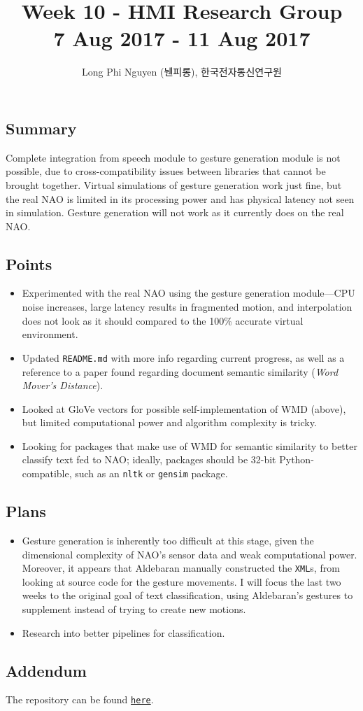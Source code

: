 \documentclass{article}
\title{Week 10 - HMI Research Group \\ \large 7 Aug 2017 - 11 Aug 2017}
\author{Long Phi Nguyen (뉀피롱), 한국전자통신연구원}
\begin{document}
  \maketitle


  \subsection*{Summary} Complete integration from speech module to gesture generation module is not possible, due to cross-compatibility issues between libraries that cannot be brought together. Virtual simulations of gesture generation work just fine, but the real NAO is limited in its processing power and has physical latency not seen in simulation. Gesture generation will not work as it currently does on the real NAO.

  \subsection*{Points}
  \begin{itemize}
    \item Experimented with the real NAO using the gesture generation module---CPU noise increases, large latency results in fragmented motion, and interpolation does not look as it should compared to the 100\% accurate virtual environment.
    \item Updated \verb|README.md| with more info regarding current progress, as well as a reference to a paper found regarding document semantic similarity (\emph{Word Mover's Distance}).
    \item Looked at GloVe vectors for possible self-implementation of WMD (above), but limited computational power and algorithm complexity is tricky.
    \item Looking for packages that make use of WMD for semantic similarity to better classify text fed to NAO; ideally, packages should be 32-bit Python-compatible, such as an \verb|nltk| or \verb|gensim| package.
  \end{itemize} 

  \subsection*{Plans}
  \begin{itemize}
    \item Gesture generation is inherently too difficult at this stage, given the dimensional complexity of NAO's sensor data and weak computational power. Moreover, it appears that Aldebaran manually constructed the \verb|XML|s, from looking at source code for the gesture movements. I will focus the last two weeks to the original goal of text classification, using Aldebaran's gestures to supplement instead of trying to create new motions.
    \item Research into better pipelines for classification.
  \end{itemize}

  \subsection*{Addendum}
  The repository can be found \href{https://github.com/longnguyen1997/nao_animations}{\texttt{here}}.
\end{document}
